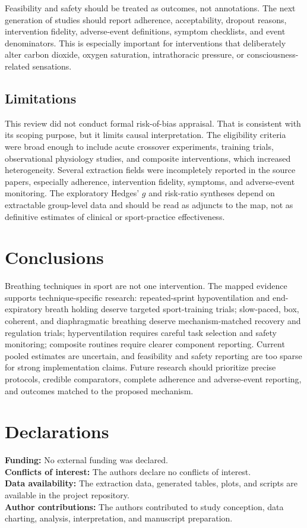 \documentclass[12pt,a4paper]{article}
\begin{document}
Feasibility and safety should be treated as outcomes, not annotations. The next generation of studies should report adherence, acceptability, dropout reasons, intervention fidelity, adverse-event definitions, symptom checklists, and event denominators. This is especially important for interventions that deliberately alter carbon dioxide, oxygen saturation, intrathoracic pressure, or consciousness-related sensations.

\subsection{Limitations}
This review did not conduct formal risk-of-bias appraisal. That is consistent with its scoping purpose, but it limits causal interpretation. The eligibility criteria were broad enough to include acute crossover experiments, training trials, observational physiology studies, and composite interventions, which increased heterogeneity. Several extraction fields were incompletely reported in the source papers, especially adherence, intervention fidelity, symptoms, and adverse-event monitoring. The exploratory Hedges' $g$ and risk-ratio syntheses depend on extractable group-level data and should be read as adjuncts to the map, not as definitive estimates of clinical or sport-practice effectiveness.

\section{Conclusions}
Breathing techniques in sport are not one intervention. The mapped evidence supports technique-specific research: repeated-sprint hypoventilation and end-expiratory breath holding deserve targeted sport-training trials; slow-paced, box, coherent, and diaphragmatic breathing deserve mechanism-matched recovery and regulation trials; hyperventilation requires careful task selection and safety monitoring; composite routines require clearer component reporting. Current pooled estimates are uncertain, and feasibility and safety reporting are too sparse for strong implementation claims. Future research should prioritize precise protocols, credible comparators, complete adherence and adverse-event reporting, and outcomes matched to the proposed mechanism.

\section*{Declarations}
\textbf{Funding:} No external funding was declared.\\
\textbf{Conflicts of interest:} The authors declare no conflicts of interest.\\
\textbf{Data availability:} The extraction data, generated tables, plots, and scripts are available in the project repository.\\
\textbf{Author contributions:} The authors contributed to study conception, data charting, analysis, interpretation, and manuscript preparation.
\end{document}
